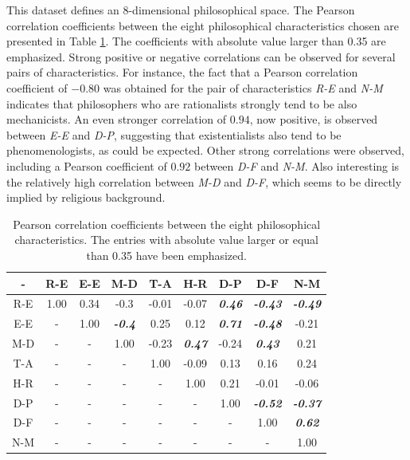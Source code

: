 \documentclass[%
 aip,
 jmp,%
 amsmath,amssymb,
 reprint,%
]{revtex4-1}
\begin{document}
This dataset defines an 8-dimensional philosophical space.  The
Pearson correlation coefficients between the eight philosophical
characteristics chosen are presented in Table \ref{tab:tableB}.  The
coefficients with absolute value larger than 0.35 are emphasized.
Strong positive or negative correlations can be observed for several
pairs of characteristics.  For instance, the fact that a Pearson
correlation coefficient of $-0.80$ was obtained for the pair of
characteristics \emph{R-E} and \emph{N-M} indicates that philosophers
who are rationalists strongly tend to be also mechanicists.  An even
stronger correlation of $0.94$, now positive, is observed between
\emph{E-E} and \emph{D-P}, suggesting that existentialists also tend
to be phenomenologists, as could be expected.  Other strong
correlations were observed, including a Pearson coefficient of $0.92$
between \emph{D-F} and \emph{N-M}.  Also interesting is the relatively
high correlation between \emph{M-D} and \emph{D-F}, which seems to be
directly implied by religious background.


\begin{table}\footnotesize%
\caption{\label{tab:tableB}Pearson correlation coefficients between the eight philosophical characteristics.  The entries with absolute
value larger or equal than 0.35 have been emphasized.}

\begin{ruledtabular}
\begin{tabular}{|c||c|c|c|c|c|c|c|c|}

- & R-E & E-E & M-D & T-A & H-R & D-P & D-F & N-M \\ \hline
R-E & 1.00 & 0.34 & -0.3 & -0.01 & -0.07 & {\bf \emph{  0.46}} & {\bf \emph{  -0.43}} & {\bf \emph{  -0.49}} \\
E-E & -    & 1.00 & {\bf \emph{  -0.4}} & 0.25 & 0.12 & {\bf \emph{  0.71}} & {\bf \emph{  -0.48}} & -0.21 \\
M-D & -    & -    & 1.00 & -0.23 & {\bf \emph{  0.47}} & -0.24 & {\bf \emph{  0.43}} & 0.21 \\
T-A & -    & -    & -    & 1.00 & -0.09 & 0.13  & 0.16 & 0.24 \\
H-R & -    & -    & -    & -    & 1.00 & 0.21 & -0.01 & -0.06 \\ 
D-P & -    & -    & -    & -    & -    & 1.00 & {\bf \emph{  -0.52}}  & {\bf \emph{  -0.37}} \\
D-F & -    & -    & -    & -    & -    & -    & 1.00 & {\bf \emph{  0.62}} \\
N-M & -    & -    & -    & -    & -    & -    & -    & 1.00 \\

\end{tabular}
\end{ruledtabular}
\end{table}
\end{document}
